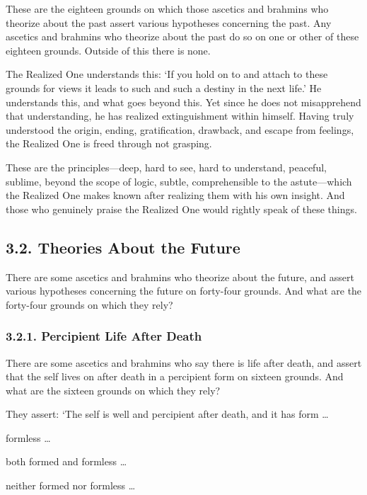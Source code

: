 \documentclass[12pt,openany]{book}%
\begin{document}
These are the eighteen grounds on which those ascetics and brahmins who theorize about the past assert various hypotheses concerning the past. Any ascetics and brahmins who theorize about the past do so on one or other of these eighteen grounds. Outside of this there is none. 

The Realized One understands this: ‘If you hold on to and attach to these grounds for views it leads to such and such a destiny in the next life.’ He understands this, and what goes beyond this. Yet since he does not misapprehend that understanding, he has realized extinguishment within himself. Having truly understood the origin, ending, gratification, drawback, and escape from feelings, the Realized One is freed through not grasping. 

These are the principles—deep, hard to see, hard to understand, peaceful, sublime, beyond the scope of logic, subtle, comprehensible to the astute—which the Realized One makes known after realizing them with his own insight. And those who genuinely praise the Realized One would rightly speak of these things. 

\subsection*{3.2. Theories About the Future }

There are some ascetics and brahmins who theorize about the future, and assert various hypotheses concerning the future on forty-four grounds. And what are the forty-four grounds on which they rely? 

\subsubsection*{3.2.1. Percipient Life After Death }

There are some ascetics and brahmins who say there is life after death, and assert that the self lives on after death in a percipient form on sixteen grounds. And what are the sixteen grounds on which they rely? 

They assert: ‘The self is well and percipient after death, and it has form … 

formless … 

both formed and formless … 

neither formed nor formless … 
\end{document}
